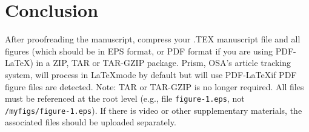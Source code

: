 \documentclass[10pt,letterpaper]{article}
\begin{document}
\section{Conclusion}
After proofreading the manuscript, compress your .TEX manuscript file and all figures (which should be in EPS format, or PDF format if you are using PDF-\LaTeX) in a ZIP, TAR or TAR-GZIP package. Prism, OSA’s article tracking system, will process in \LaTeX mode by default but will use PDF-\LaTeX if PDF figure files are detected. Note: TAR or TAR-GZIP is no longer required. All files must be referenced at the root level (e.g., file \texttt{figure-1.eps}, not \texttt{/myfigs/figure-1.eps}). If there is video or other supplementary materials, the associated files should be uploaded separately.
\end{document}
